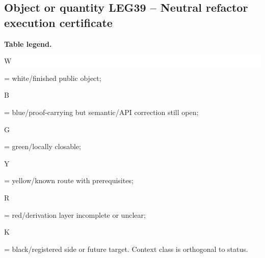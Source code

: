 \subsection*{Object or quantity LEG39 -- Neutral refactor execution certificate}
\hypertarget{objproof:LEG39}{}
\par\smallskip\noindent\begin{minipage}{0.99\linewidth}\footnotesize\raggedright\textbf{Table legend.} \colorbox{white}{\strut W} = white/finished public object; \colorbox{cyan!20}{\strut B} = blue/proof-carrying but semantic/API correction still open; \colorbox{green!18}{\strut G} = green/locally closable; \colorbox{yellow!25}{\strut Y} = yellow/known route with prerequisites; \colorbox{red!20}{\strut R} = red/derivation layer incomplete or unclear; \colorbox{black!18}{\strut K} = black/registered side or future target. Context class is orthogonal to status.\end{minipage}\par\vspace{0.25em}
